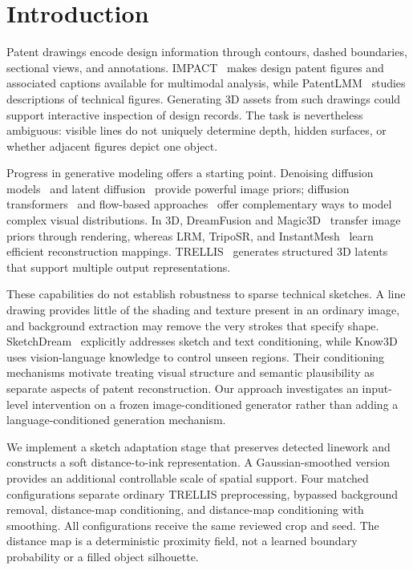 \section{Introduction}
\label{sec:intro}

Patent drawings encode design information through contours, dashed boundaries,
sectional views, and annotations. IMPACT~\cite{shomee2024impact} makes design
patent figures and associated captions available for multimodal analysis, while
PatentLMM~\cite{shukla2025patentlmm} studies descriptions of technical figures.
Generating 3D assets from such drawings could support interactive inspection of
design records. The task is nevertheless ambiguous: visible lines do not uniquely
determine depth, hidden surfaces, or whether adjacent figures depict one object.

Progress in generative modeling offers a starting point. Denoising diffusion
models~\cite{ho2020ddpm,song2020ddim} and latent diffusion~\cite{rombach2022ldm}
provide powerful image priors; diffusion transformers~\cite{peebles2023dit} and
flow-based approaches~\cite{lipman2023flow,liu2023rectified} offer complementary
ways to model complex visual distributions. In 3D, DreamFusion and
Magic3D~\cite{poole2022dreamfusion,lin2023magic3d} transfer image priors through
rendering, whereas LRM, TripoSR, and InstantMesh~\cite{hong2023lrm,tochilkin2024triposr,xu2024instantmesh}
learn efficient reconstruction mappings. TRELLIS~\cite{xiang2025trellis} generates
structured 3D latents that support multiple output representations.

These capabilities do not establish robustness to sparse technical sketches.
A line drawing provides little of the shading and texture present in an ordinary
image, and background extraction may remove the very strokes that specify shape.
SketchDream~\cite{liu2024sketchdream} explicitly addresses sketch and text
conditioning, while Know3D~\cite{chen2026know3d} uses vision-language knowledge to
control unseen regions. Their conditioning mechanisms motivate treating visual
structure and semantic plausibility as separate aspects of patent reconstruction.
Our approach investigates an input-level intervention on a frozen image-conditioned
generator rather than adding a language-conditioned generation mechanism.

We implement a sketch adaptation stage that preserves detected linework and
constructs a soft distance-to-ink representation. A Gaussian-smoothed version
provides an additional controllable scale of spatial support. Four matched
configurations separate ordinary TRELLIS preprocessing, bypassed background
removal, distance-map conditioning, and distance-map conditioning with smoothing.
All configurations receive the same reviewed crop and seed. The distance map is
a deterministic proximity field, not a learned boundary probability or a filled
object silhouette.

